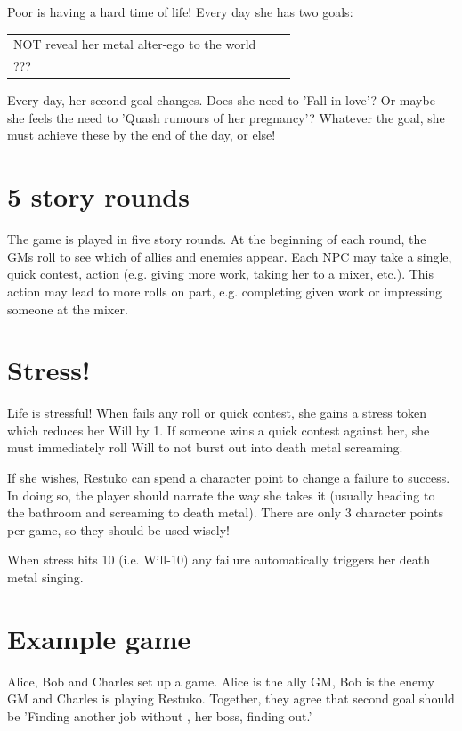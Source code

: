 \documentclass[onepage]{memoir}
\begin{document}
\begin{multicols}{2}
Poor \retsuko is having a hard time of life! Every day she has two goals:

\begin{tabular}{p{0.9\linewidth}}
    NOT reveal her metal alter-ego to the world \\
    ???
\end{tabular}

Every day, her second goal changes. Does she need to 'Fall in love'? Or maybe she feels the need to 'Quash rumours of her pregnancy'? Whatever the goal, she must achieve these by the end of the day, or else!

\section{5 story rounds}
\label{sec:5-story-rounds}


The game is played in five story rounds. At the beginning of each round, the GMs roll to see which of \retsukos allies and enemies appear. Each NPC may take a single, quick contest, action (e.g. giving \retsuko more work, taking her to a mixer, etc.). This action may lead to more rolls on \retsukos part, e.g. completing given work or impressing someone at the mixer.

\section{Stress!}
\label{sec:stress}


Life is stressful! When \retsuko fails any roll or quick contest, she gains a stress token which reduces her Will by 1. If someone wins a quick contest against her, she must immediately roll Will to not burst out into death metal screaming.

If she wishes, Restuko can spend a character point to change a failure to success. In doing so, the player should narrate the way she takes it (usually heading to the bathroom and screaming to death metal). There are only 3 character points per game, so they should be used wisely!

When \retsukos stress hits 10 (i.e. Will-10) any failure automatically triggers her death metal singing.

\section{Example game}
\label{sec:example-game}


Alice, Bob and Charles set up a game. Alice is the ally GM, Bob is the enemy GM and Charles is playing Restuko. Together, they agree that \retsukos second goal should be 'Finding another job without \ton, her boss, finding out.'


\end{multicols}
\end{document}
